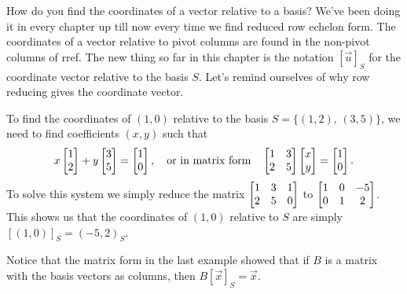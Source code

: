 How do you find the coordinates of a vector relative to a basis? We've been doing it in every chapter up till now every time we find reduced row echelon form.  The coordinates of a vector relative to pivot columns are found in the non-pivot columns of rref.  The new thing so far in this chapter is the notation $[\vec u]_S$ for the coordinate vector relative to the basis $S$.  Let's remind ourselves of why row reducing gives the coordinate vector.
\begin{example}
To find the coordinates of $(1,0)$ relative to the basis $S=\{(1,2),\,(3,5)\}$, we need to find coefficients $(x,y)$ such that $$x\begin{bmatrix} 1\\2 \end{bmatrix}+y\begin{bmatrix} 3\\5 \end{bmatrix} = \begin{bmatrix} 1\\0 \end{bmatrix}, \quad \text{or in matrix form} \quad \begin{bmatrix} \begin{matrix} 1\\2 \end{matrix}&\begin{matrix} 3\\5 \end{matrix} \end{bmatrix}\begin{bmatrix} x\\y \end{bmatrix}=\begin{bmatrix} 1\\0 \end{bmatrix}.$$ 
To solve this system we simply reduce the matrix $\begin{bmatrix} \begin{matrix} 1\\2 \end{matrix}&\begin{matrix} 3\\5 \end{matrix}&\begin{matrix} 1\\0 \end{matrix} \end{bmatrix}$ to $\begin{bmatrix} \begin{matrix} 1\\0 \end{matrix}&\begin{matrix} 0\\1 \end{matrix}&\begin{matrix} -5\\2 \end{matrix} \end{bmatrix}$.
This shows us that the coordinates of $(1,0)$ relative to $S$ are simply $[(1,0)]_S = (-5,2)_S$. 
\end{example}

Notice that the matrix form in the last example showed that if $B$ is a matrix with the basis vectors as columns, then $B[\vec x]_S=\vec x$.

